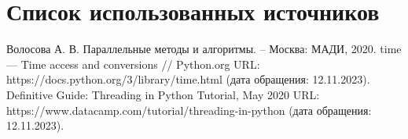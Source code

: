 \chapter*{Список использованных источников}

\begin{enumerate}
	 Волосова А. В. Параллельные методы и алгоритмы. -- Москва: МАДИ, 2020.
	 time — Time access and conversions // Python.org URL: \newline https://docs.python.org/3/library/time.html (дата обращения: 12.11.2023).
	 Definitive Guide: Threading in Python Tutorial, May 2020 URL: \newline
	https://www.datacamp.com/tutorial/threading-in-python (дата обращения: 12.11.2023).
\end{enumerate}
